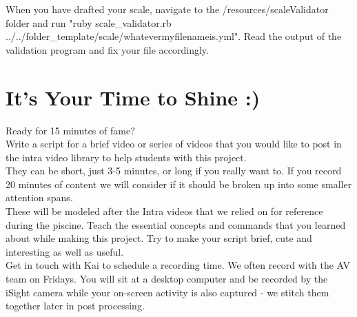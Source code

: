 \documentclass{42-en}
\begin{document}
When you have drafted your scale, navigate to the /resources/scaleValidator folder and run "ruby scale\_validator.rb ../../folder\_template/scale/whatevermyfilenameis.yml". Read the output of the validation program and fix your file accordingly.


\chapter{It's Your Time to Shine :)}

Ready for 15 minutes of fame?\\

Write a script for a brief video or series of videos that you would like to post in the intra video library to help students with this project.\\

They can be short, just 3-5 minutes, or long if you really want to. If you record 20 minutes of content we will consider if it should be broken up into some smaller attention spans.\\

These will be modeled after the Intra videos that we relied on for reference during the piscine. Teach the essential concepts and commands that you learned about while making this project. Try to make your script brief, cute and interesting as well as useful.\\

Get in touch with Kai to schedule a recording time. We often record with the AV team on Fridays. You will sit at a desktop computer and be recorded by the iSight camera while your on-screen activity is also captured - we stitch them together later in post processing.

\end{document}

